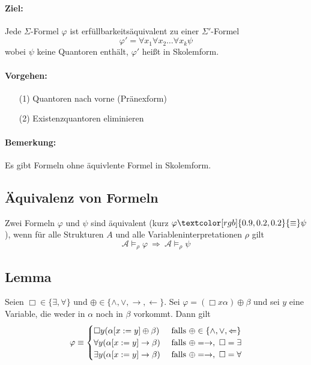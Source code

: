 \documentclass[12pt,a4paper]{report}
\newcommand{\ra}{\rightarrow}
\newcommand{\RA}{\Rightarrow}
\newcommand{\red}[1]{\textcolor[rgb]{0.9,0.2,0.2}{#1}}
\newcommand{\green}[1]{\textcolor[rgb]{0.1,0.6,0.1}{#1}}
\newcommand{\blue}[1]{\textcolor[rgb]{0.2,0.2,1}{#1}}
\begin{document}
\paragraph{Ziel:} Jede $ \Sigma $-Formel $ \varphi $ ist erfüllbarkeitsäquivalent zu einer $ \Sigma' $-Formel
\[
    \varphi' = \forall x_1 \forall x_2 \dots \forall x_k \psi
\]
wobei $ \psi $ keine Quantoren enthält, $ \varphi' $ heißt \red{in Skolemform}.
\paragraph{Vorgehen:}
\begin{itemize}
    \item[(1)] Quantoren nach vorne (Pränexform)
    \item[(2)] Existenzquantoren eliminieren
\end{itemize}
\paragraph{Bemerkung:} Es gibt Formeln ohne äquivlente Formel in Skolemform.

\subsection{\blue{Äquivalenz von Formeln}}
Zwei Formeln $ \varphi $ und $ \psi $ sind \red{äquivalent} (kurz $ \varphi \red{\equiv} \psi $), wenn für alle Strukturen $ A $ und alle Variableninterpretationen $ \rho $ gilt
\[
    \mathcal{A} \vDash_\rho \varphi ~\RA~ \mathcal{A} \vDash_\rho \psi
\]
\subsection{\green{Lemma}}
Seien $ \Box \in \{\exists, \forall\} $ und $ \oplus \in \{\wedge, \vee, \ra, \leftarrow\} $. \newline
Sei $ \varphi = (\Box x \alpha) \oplus \beta $ und sei $ y $ eine Variable, die weder in $ \alpha $ noch in $ \beta $ vorkommt. Dann gilt
\[
    \varphi \equiv \begin{cases}
        \Box y (\alpha[x:=y] \oplus \beta) & \textnormal{ falls } \oplus \in \{\wedge, \vee, \Leftarrow\}\\
        \forall y (\alpha[x:=y] \ra \beta) & \textnormal{ falls } \oplus = \ra,~ \Box = \exists\\
        \exists y (\alpha[x := y] \ra \beta) & \textnormal{ falls } \oplus = \ra,~ \Box = \forall
    \end{cases}
\]
\end{document}
